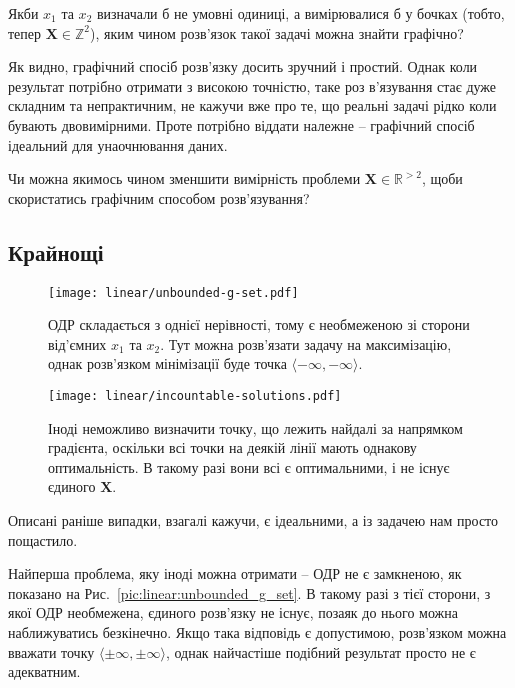 \documentclass[\main/book.tex]{subfiles}
\begin{document}
\begin{question}
 Якби $x_1$ та $x_2$ визначали б не умовні одиниці, а вимірювалися б у бочках (тобто, тепер $\mathbf{X} \in \mathbb{Z}^2$), яким чином розв'язок такої задачі можна знайти графічно?
\end{question}

Як видно, графічний спосіб розв'язку досить зручний і простий. Однак коли результат потрібно отримати з високою точністю, таке роз
\-в'я\-зу\-ван\-ня стає дуже складним та непрактичним, не кажучи вже про те, що реальні задачі рідко коли бувають двовимірними. Проте потрібно віддати належне -- графічний спосіб ідеальний для унаочнювання даних.

\begin{question}
 Чи можна якимось чином зменшити вимірність проблеми ${\mathbf{X} \in \mathbb{R}^{> 2}}$, щоби скористатись графічним способом розв'язування?
\end{question}


\subsection{Крайнощі}

\begin{figure*}
\centering
\begin{minipage}[t]{.47\textwidth}
 \texttt{[image: linear/unbounded-g-set.pdf]}
 \caption{ОДР складається з однієї нерівності, тому є необмеженою зі сторони від'ємних $x_1$ та $x_2$. Тут можна розв'язати задачу на максимізацію, однак розв'язком мінімізації буде точка $\langle -\infty, -\infty \rangle$.}
 \label{pic:linear:unbounded_g_set}
\end{minipage}\qquad
\begin{minipage}[t]{.47\textwidth}
 \texttt{[image: linear/incountable-solutions.pdf]}
 \caption{Іноді неможливо визначити точку, що лежить найдалі за напрямком градієнта, оскільки всі точки на деякій лінії мають однакову оптимальність. В такому разі вони всі є оптимальними, і не існує єдиного $\mathbf{X}$.}
 \label{pic:linear:incountable_solutions}
\end{minipage}
\end{figure*}

Описані раніше випадки, взагалі кажучи, є ідеальними, а із задачею нам просто пощастило.

Найперша проблема, яку іноді можна отримати -- ОДР не є замкненою, як показано на Рис.~\ref{pic:linear:unbounded_g_set}. В такому разі з тієї сторони, з якої ОДР необмежена, єдиного розв'язку не існує, позаяк до нього можна наближуватись безкінечно. Якщо така відповідь є допустимою, розв'язком можна вважати точку ${\langle \pm \infty, \pm \infty \rangle}$, однак найчастіше подібний результат просто не є адекватним.
\end{document}
